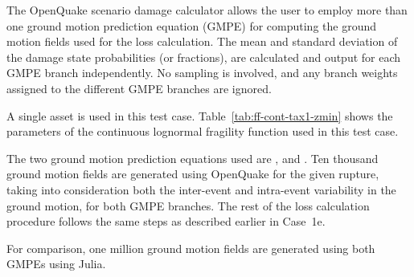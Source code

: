 The OpenQuake scenario damage calculator allows the user to employ more than one ground motion prediction equation (GMPE) for computing the ground motion fields used for the loss calculation. The mean and standard deviation of the damage state probabilities (or fractions), are calculated and output for each GMPE branch independently. No sampling is involved, and any branch weights assigned to the different GMPE branches are ignored.

A single asset is used in this test case. Table~\ref{tab:ff-cont-tax1-zmin} shows the parameters of the continuous lognormal fragility function used in this test case.

The two ground motion prediction equations used are \citet{boore2008}, and \citet{chiou2008}. Ten thousand ground motion fields are generated using OpenQuake for the given rupture, taking into consideration both the inter-event and intra-event variability in the ground motion, for both GMPE branches. The rest of the loss calculation procedure follows the same steps as described earlier in Case~1e.

For comparison, one million ground motion fields are generated using both GMPEs using Julia.